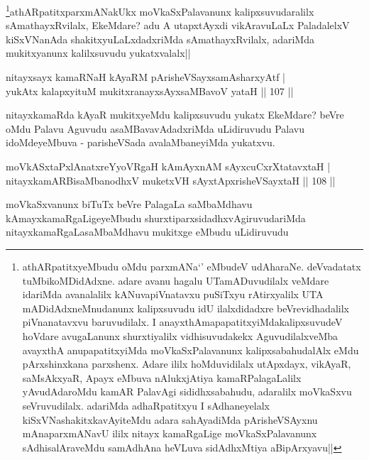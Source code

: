 \begin{artha}
\footnote{athARpatitxyeMbudu oMdu parxmANa`\stext' eMbudeV udAharaNe. deVvadatatx tuMbikoMDidAdxne. adare avanu hagalu UTamADuvudilalx veMdare idariMda avanalalilx kANuvapiVnatavxu puSiTxyu rAtirxyalilx UTA mADidAdxneMnudanunx kalipxsuvudu idU ilalxdidadxre beVrevidhadalilx piVnanatavxvu baruvudilalx. I anayxthAmapapatitxyiMdakalipxsuvudeV hoVdare avugaLanunx shurxtiyalilx vidhisuvudakekx AguvudilalxveMba avayxthA anupapatitxyiMda moVkaSxPalavanunx kalipxsabahudalAlx eMdu pArxshinxkana parxshenx. Adare ililx hoMduvidilalx utApxdayx, vikAyaR, saMsAkxyaR, Apayx eMbuva nAlukxjAtiya kamaRPalagaLalilx yAvudAdaroMdu kamAR PalavAgi sididhxsabahudu, adaralilx moVkaSxvu seVruvudilalx. adariMda adhaRpatitxyu I sAdhaneyelalx kiSxVNashakitxkavAyiteMdu adara sahAyadiMda pArisheVSAyxnu mAnaparxmANavU ililx nitayx kamaRgaLige moVkaSxPalavanunx sAdhisalAraveMdu samAdhAna heVLuva sidAdhxMtiya aBipArxyavu||}athARpatitxparxmANakUkx moVkaSxPalavanunx kalipxsuvudaralilx sAmathayxRvilalx, EkeMdare? adu A utapxtAyxdi vikAravuLaLx PaladalelxV kiSxVNanAda shakitxyuLaLxdadxriMda sAmathayxRvilalx, adariMda mukitxyanunx kalilxsuvudu yukatxvalalx||
\end{artha}


\begin{shl}
nitayxsayx kamaRNaH kAyaRM pArisheVSayxsamAsharxyAtf |\\
yukAtx kalapxyituM mukitxranayxsAyxsaMBavoV yataH \hfill || 107 ||
\end{shl}

\begin{artha}
nitayxkamaRda kAyaR mukitxyeMdu kalipxsuvudu yukatx EkeMdare? beVre oMdu Palavu Aguvudu asaMBavavAdadxriMda uLidiruvudu Palavu idoMdeyeMbuva - parisheVSada avalaMbaneyiMda yukatxvu.
\end{artha}

\begin{shl}
moVkASxtaPxlAnatxreYyoVRgaH kAmAyxnAM sAyxcuCxrXtatavxtaH |\\
nitayxkamARBisaMbanodhxV muketxVH sAyxtApxrisheVSayxtaH \hfill || 108 ||
\end{shl}

\begin{artha}
moVkaSxvanunx biTuTx beVre PalagaLa saMbaMdhavu kAmayxkamaRgaLigeyeMbudu shurxtiparxsidadhxvAgiruvudariMda nitayxkamaRgaLasaMbaMdhavu mukitxge eMbudu uLidiruvudu
\end{artha}

